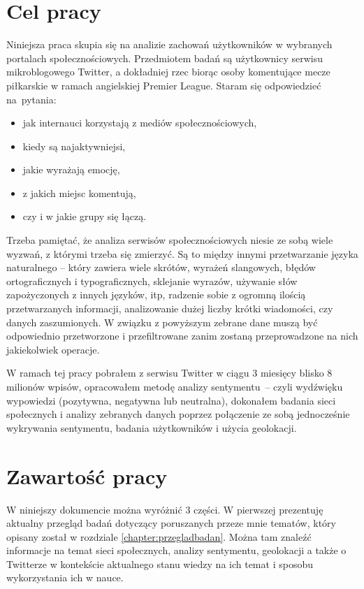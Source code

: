 \section{Cel pracy}
Niniejsza praca skupia się na analizie zachowań użytkowników w wybranych
portalach społecznościowych. Przedmiotem badań są użytkownicy serwisu
mikroblogowego Twitter, a dokładniej rzec biorąc osoby komentujące mecze
piłkarskie w ramach angielskiej Premier League.
Staram się odpowiedzieć na~pytania:
\begin{itemize}
  \item jak internauci korzystają z mediów społecznościowych,
  \item kiedy są najaktywniejsi,
  \item jakie wyrażają emocję,
  \item z jakich miejsc komentują,
  \item czy i w jakie grupy się łączą.
\end{itemize}

Trzeba pamiętać, że analiza serwisów społecznościowych niesie ze sobą wiele 
wyzwań, z którymi trzeba się zmierzyć. Są to między innymi przetwarzanie
języka naturalnego -- który zawiera wiele skrótów, wyrażeń slangowych, błędów
ortograficznych i typograficznych, sklejanie wyrazów, używanie słów zapożyczonych
z innych języków, itp, radzenie sobie z ogromną ilością przetwarzanych informacji,
analizowanie dużej liczby krótki wiadomości, czy danych zaszumionych.
W związku z powyższym zebrane dane muszą być odpowiednio przetworzone i przefiltrowane
zanim zostaną przeprowadzone na nich jakiekolwiek operacje.

W ramach tej pracy pobrałem z serwisu Twitter w ciągu 3 miesięcy blisko 8
milionów wpisów, opracowałem metodę analizy sentymentu~-- czyli wydźwięku
wypowiedzi (pozytywna, negatywna lub neutralna), dokonałem badania sieci
społecznych i analizy zebranych danych poprzez połączenie ze sobą jednocześnie
wykrywania sentymentu, badania użytkowników i użycia geolokacji.

\section{Zawartość pracy}
W niniejszy dokumencie można wyróżnić 3 części. W pierwszej prezentuję
aktualny przegląd badań dotyczący poruszanych przeze mnie tematów, który
opisany został w rozdziale \ref{chapter:przegladbadan}. Można tam znaleźć
informacje na temat sieci społecznych, analizy sentymentu, geolokacji
a także o Twitterze w kontekście aktualnego stanu wiedzy na ich temat i sposobu
wykorzystania ich w nauce.

